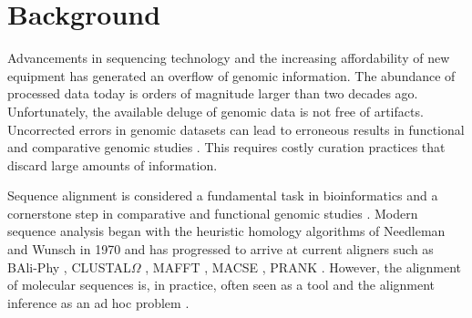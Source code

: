 \section{Background}


Advancements in sequencing technology and the increasing affordability of new
equipment has generated an overflow of genomic information.
The abundance of processed data today is orders of magnitude larger than two
decades ago. %
Unfortunately, the available deluge of genomic data is not free of artifacts.
Uncorrected errors in genomic datasets can lead to erroneous results in
functional and comparative genomic studies \parencite{estimates_schneider_2009}.
This requires costly curation practices that discard large amounts of
information.

Sequence alignment is considered a fundamental task in bioinformatics and a
cornerstone step in comparative and functional genomic studies
\parencite{sequence_alignment_rosenberg_2009}.
Modern sequence analysis began with the heuristic homology algorithms of
Needleman and Wunsch in 1970 \parencite{identification_smith_1981} and has
progressed to arrive at current aligners such as BAli-Phy \parencite{suchard_baliphy_2006},
CLUSTAL$\Omega$ \parencite{clustal_omega_sievers_2011}, MAFFT \parencite{mafft_katoh_2002},
MACSE \parencite{ranwez_macse_2011}, PRANK \parencite{prank_loytynoja_2014}.
However, the alignment of molecular sequences is, in practice, often seen as a
tool and the alignment inference as an ad hoc problem
\parencite{morrison_MSA_2018}.

